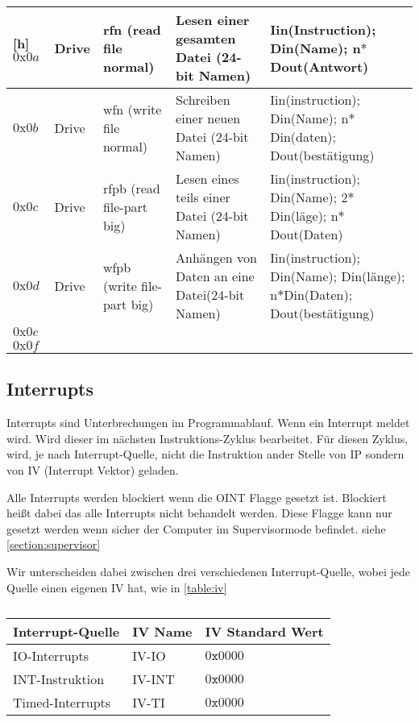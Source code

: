 \documentclass{scrartcl}
\begin{document}
\begin{center}
\begin{longtable}{p{} | p{} | p{} | p{} | p{}}[h]
			\hline
			 $0\text{x}0a$ & Drive & rfn (read file normal) & Lesen einer gesamten Datei (24-bit Namen)  & Iin(Instruction); Din(Name); n$*$Dout(Antwort) \\
			\hline
			 $0\text{x}0b$ & Drive & wfn (write file normal) & Schreiben einer neuen Datei (24-bit Namen) & Iin(instruction); Din(Name); n$*$Din(daten); Dout(bestätigung) \\
			\hline
			 $0\text{x}0c$ & Drive & rfpb (read file-part big) & Lesen eines teils einer Datei (24-bit Namen) & Iin(instruction); Din(Name); 2$*$Din(läge); n$*$Dout(Daten) \\
			\hline
			 $0\text{x}0d$ & Drive & wfpb (write file-part big) & Anhängen von Daten an eine Datei(24-bit Namen) & Iin(instruction); Din(Name); Din(länge); n$*$Din(Daten); Dout(bestätigung) \\
			\hline
			 $0\text{x}0e$ &  & & & \\
			\hline
			 $0\text{x}0f$ &  & & &

	\end{longtable}
\end{center}

\subsection{\label{section:interrupts}Interrupts}

Interrupts sind Unterbrechungen im Programmablauf. Wenn ein Interrupt meldet wird. Wird dieser im nächsten Instruktions-Zyklus bearbeitet. Für diesen Zyklus, wird, je nach Interrupt-Quelle, nicht die Instruktion ander Stelle von IP sondern von IV (Interrupt Vektor) geladen.

Alle Interrupts werden blockiert wenn die OINT Flagge gesetzt ist. Blockiert heißt dabei das alle Interrupts nicht behandelt werden. Diese Flagge kann nur gesetzt werden wenn sicher der Computer im Supervisormode befindet. siehe \ref*{section:supervisor}

Wir unterscheiden dabei zwischen drei verschiedenen Interrupt-Quelle, wobei jede Quelle einen eigenen IV hat, wie in \autoref{table:iv}

\begin{center}	
	\begin{table}[h]
		\caption{\label{table:iv}}
		\begin{tabular}{l | l l}
			Interrupt-Quelle & IV Name & IV Standard Wert \\
			\hline
			IO-Interrupts & IV-IO & $0\texttt{x}0000$ \\
			INT-Instruktion & IV-INT & $0\texttt{x}0000$ \\
			Timed-Interrupts & IV-TI & $0\texttt{x}0000$ \\
		\end{tabular}
	\end{table}
\end{center}
\end{document}
